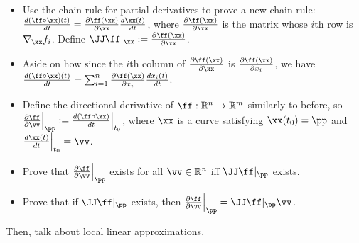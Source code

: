 \begin{itemize}
    \item Use the chain rule for partial derivatives to prove a new chain rule: $\frac{d (\ff \circ \xx)(t)}{dt} = \frac{\pd \ff(\xx)}{\pd \xx} \frac{d\xx(t)}{dt}$, where $\frac{\pd \ff(\xx)}{\pd \xx}$ is the matrix whose $i$th row is $\nabla_\xx f_i$. Define $\JJ \ff|_\xx := \frac{\pd \ff(\xx)}{\pd \xx}$.
    \item Aside on how since the $i$th column of $\frac{\pd \ff(\xx)}{\pd \xx}$ is $\frac{\pd \ff(\xx)}{\pd x_i}$, we have $\frac{d (\ff \circ \xx)(t)}{dt} = \sum_{i = 1}^{n} \frac{\pd \ff(\xx)}{\pd x_i} \frac{d x_i(t)}{dt}$.
    \item Define the directional derivative of $\ff:\R^n \rightarrow \R^m$ similarly to before, so $\frac{\pd \ff}{\pd \vv} \Big|_\pp := \frac{d (\ff \circ \xx)}{dt}\Big|_{t_0}$, where $\xx$ is a curve satisfying $\xx(t_0) = \pp$ and $\frac{d\xx(t)}{dt}\Big|_{t_0} = \vv$.
    \item Prove that $\frac{\pd \ff}{\pd \vv}\Big|_\pp$ exists for all $\vv \in \R^n$ iff $\JJ \ff|_\pp$ exists.
    \item Prove that if $\JJ \ff|_\pp$ exists, then $\frac{\pd \ff}{\pd \vv}\Big|_\pp = \JJ \ff|_\pp \vv$.
\end{itemize}

Then, talk about local linear approximations. 

